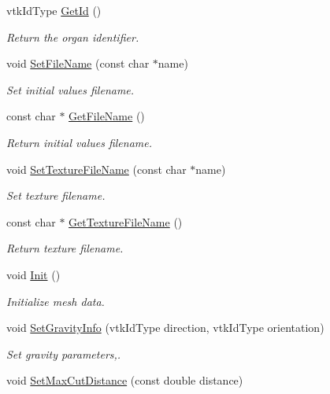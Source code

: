 \begin{DoxyCompactItemize}
vtkIdType \hyperlink{classvtkOrgan_a8e45f79da9c4e7029492ced2f55c25ed}{GetId} ()
\begin{DoxyCompactList}\small\item\em Return the organ identifier. \item\end{DoxyCompactList}\item 
void \hyperlink{classvtkOrgan_a9fad20fc19aadd62505ed6a39e482d23}{SetFileName} (const char $\ast$name)
\begin{DoxyCompactList}\small\item\em Set initial values filename. \item\end{DoxyCompactList}\item 
const char $\ast$ \hyperlink{classvtkOrgan_a83331bddcf2a07b54a5df5e6e23b130f}{GetFileName} ()
\begin{DoxyCompactList}\small\item\em Return initial values filename. \item\end{DoxyCompactList}\item 
void \hyperlink{classvtkOrgan_af19a32e071ae5f9c9848b2ad7088d0c1}{SetTextureFileName} (const char $\ast$name)
\begin{DoxyCompactList}\small\item\em Set texture filename. \item\end{DoxyCompactList}\item 
const char $\ast$ \hyperlink{classvtkOrgan_aaec0735181654c6500d0767eed30b94d}{GetTextureFileName} ()
\begin{DoxyCompactList}\small\item\em Return texture filename. \item\end{DoxyCompactList}\item 
void \hyperlink{classvtkOrgan_a48aa20d7255903b3f7ac5cd2a4adec8c}{Init} ()
\begin{DoxyCompactList}\small\item\em Initialize mesh data. \item\end{DoxyCompactList}\item 
void \hyperlink{classvtkOrgan_ae3f6ea53f0d615fae5f9e2796e4075a2}{SetGravityInfo} (vtkIdType direction, vtkIdType orientation)
\begin{DoxyCompactList}\small\item\em Set gravity parameters,. \item\end{DoxyCompactList}\item 
\hypertarget{classvtkOrgan_a4a91419279ab9b51f657f7d0cf613a0c}{
void \hyperlink{classvtkOrgan_a4a91419279ab9b51f657f7d0cf613a0c}{SetMaxCutDistance} (const double distance)}
\label{classvtkOrgan_a4a91419279ab9b51f657f7d0cf613a0c}


\end{DoxyCompactItemize}
